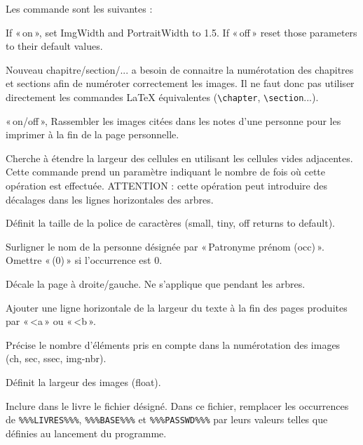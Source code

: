 Les commande \gwtol{} sont les suivantes :

\begin{description}[style=nextline]
\item[Arbres/Trees] If «\,on\,», set ImgWidth and PortraitWidth to 1.5.
If «\,off\,» reset those parameters to their default values.
\item[Chapter/Section/SubSection/SubSubSection] Nouveau chapitre/section/...
\gwtol{} a besoin de connaitre la numérotation des chapitres et sections afin
de numéroter correctement les images. Il ne faut donc pas utiliser directement
les commandes \LaTeX{} équivalentes (\verb|\chapter|, \verb|\section|...).
\item[CollectImages] «\,on/off\,», Rassembler les images citées dans les notes
d'une personne pour les imprimer à la fin de la page personnelle.
\item[Expand] Cherche à étendre la largeur des cellules en utilisant
les cellules vides adjacentes. Cette commande prend un paramètre indiquant
le nombre de fois où cette opération est effectuée. ATTENTION : cette opération
peut introduire des décalages dans les lignes horizontales des arbres.
\item[FontSize] Définit la taille de la police de caractères\label{fontsize}
(small, tiny, off returns to default).
\item[HighLight] Surligner le nom de la personne désignée par
«\,Patronyme prénom (occ)\,». Omettre «\,(0)\,» si l'occurrence est 0.
\item[Hoffset] Décale la page à droite/gauche. Ne s'applique que pendant les arbres.
\item[Hrule] Ajouter une ligne horizontale de la largeur du texte à la fin
des pages produites par «\,<a\,» ou «\,<b\,».
\item[ImageLabel] Précise le nombre d'éléments pris en compte dans
la numérotation des images (ch, sec, ssec, img-nbr).
\item[ImgWidth] Définit la largeur des images (float).
\item[Input] Inclure dans le livre le fichier désigné. Dans ce fichier,
remplacer les occurrences de \verb|%%%LIVRES%%%|, \verb|%%%BASE%%%| et
\verb|%%%PASSWD%%%| par leurs valeurs telles que définies au lancement du programme.

\end{description}
